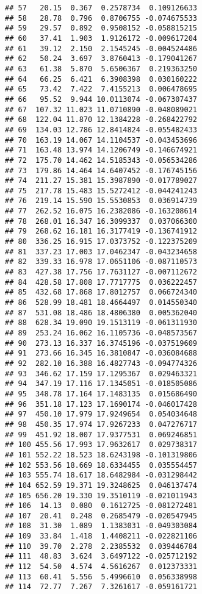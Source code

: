 \documentclass[]{book}
\theoremstyle{definition}
\theoremstyle{definition}
\theoremstyle{definition}
\theoremstyle{remark}
\begin{document}
\begin{verbatim}
## 57   20.15  0.367  0.2578734  0.109126633
## 58   28.78  0.796  0.8706755 -0.074675533
## 59   29.57  0.892  0.9508152 -0.058815215
## 60   37.41  1.903  1.9126172 -0.009617204
## 61   39.12  2.150  2.1545245 -0.004524486
## 62   50.24  3.697  3.8760413 -0.179041267
## 63   61.38  5.870  5.6506367  0.219363250
## 64   66.25  6.421  6.3908398  0.030160222
## 65   73.42  7.422  7.4155213  0.006478695
## 66   95.52  9.944 10.0113074 -0.067307437
## 67  107.32 11.023 11.0710890 -0.048089021
## 68  122.04 11.870 12.1384228 -0.268422792
## 69  134.03 12.786 12.8414824 -0.055482433
## 70  163.19 14.067 14.1104537 -0.043453696
## 71  163.48 13.974 14.1206749 -0.146674921
## 72  175.70 14.462 14.5185343 -0.056534286
## 73  179.86 14.464 14.6407452 -0.176745156
## 74  211.27 15.381 15.3987890 -0.017789027
## 75  217.78 15.483 15.5272412 -0.044241243
## 76  219.14 15.590 15.5530853  0.036914739
## 77  262.52 16.075 16.2382086 -0.163208614
## 78  268.01 16.347 16.3099337  0.037066300
## 79  268.62 16.181 16.3177419 -0.136741912
## 80  336.25 16.915 17.0373752 -0.122375209
## 81  337.23 17.003 17.0462347 -0.043234658
## 82  339.33 16.978 17.0651106 -0.087110573
## 83  427.38 17.756 17.7631127 -0.007112672
## 84  428.58 17.808 17.7717775  0.036222457
## 85  432.68 17.868 17.8012757  0.066724340
## 86  528.99 18.481 18.4664497  0.014550340
## 87  531.08 18.486 18.4806380  0.005362040
## 88  628.34 19.090 19.1513119 -0.061311930
## 89  253.24 16.062 16.1105736 -0.048573567
## 90  273.13 16.337 16.3745196 -0.037519609
## 91  273.66 16.345 16.3810847 -0.036084688
## 92  282.10 16.388 16.4827743 -0.094774326
## 93  346.62 17.159 17.1295367  0.029463321
## 94  347.19 17.116 17.1345051 -0.018505086
## 95  348.78 17.164 17.1483135  0.015686490
## 96  351.18 17.123 17.1690174 -0.046017428
## 97  450.10 17.979 17.9249654  0.054034648
## 98  450.35 17.974 17.9267233  0.047276717
## 99  451.92 18.007 17.9377531  0.069246851
## 100 455.56 17.993 17.9632617  0.029738317
## 101 552.22 18.523 18.6243198 -0.101319806
## 102 553.56 18.669 18.6334455  0.035554457
## 103 555.74 18.617 18.6482984 -0.031298442
## 104 652.59 19.371 19.3248625  0.046137474
## 105 656.20 19.330 19.3510119 -0.021011943
## 106  14.13  0.080  0.1612725 -0.081272481
## 107  20.41  0.248  0.2685479 -0.020547945
## 108  31.30  1.089  1.1383031 -0.049303084
## 109  33.84  1.418  1.4408211 -0.022821106
## 110  39.70  2.278  2.2385532  0.039446784
## 111  48.83  3.624  3.6497122 -0.025712192
## 112  54.50  4.574  4.5616267  0.012373331
## 113  60.41  5.556  5.4996610  0.056338998
## 114  72.77  7.267  7.3261617 -0.059161721

\end{verbatim}
\end{document}
